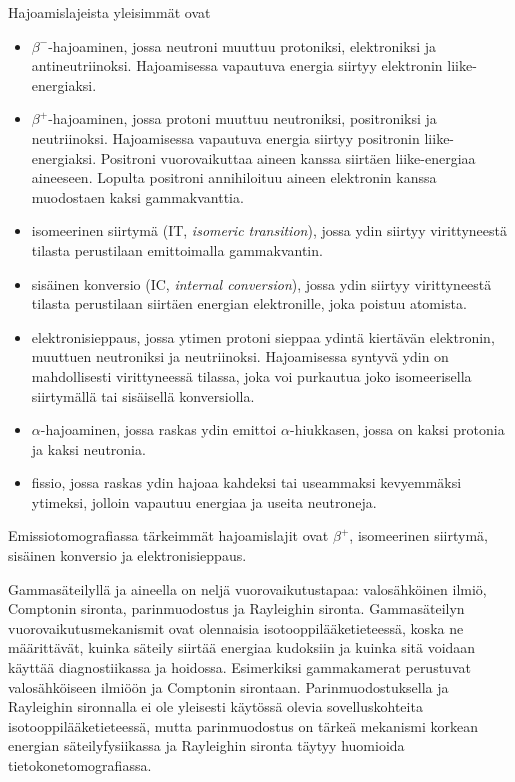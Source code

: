 Hajoamislajeista yleisimmät ovat\cite{cherry_modes_2012}
\begin{itemize}
    \item $\beta^{-}$-hajoaminen, jossa neutroni muuttuu protoniksi, elektroniksi ja antineutriinoksi.  Hajoamisessa vapautuva energia siirtyy elektronin liike-energiaksi.
    \item $\beta^{+}$-hajoaminen, jossa protoni muuttuu neutroniksi, positroniksi ja neutriinoksi. Hajoamisessa vapautuva energia siirtyy positronin liike-energiaksi. Positroni vuorovaikuttaa aineen kanssa siirtäen liike-energiaa aineeseen. Lopulta positroni annihiloituu aineen elektronin kanssa muodostaen kaksi gammakvanttia.
    \item isomeerinen siirtymä (IT, \textit{isomeric transition}), jossa ydin siirtyy virittyneestä tilasta perustilaan emittoimalla gammakvantin.
    \item sisäinen konversio (IC, \textit{internal conversion}), jossa ydin siirtyy virittyneestä tilasta perustilaan siirtäen energian elektronille, joka poistuu atomista.
    \item elektronisieppaus, jossa ytimen protoni sieppaa ydintä kiertävän elektronin, muuttuen neutroniksi ja neutriinoksi. Hajoamisessa syntyvä ydin on mahdollisesti virittyneessä tilassa, joka voi purkautua joko isomeerisella siirtymällä tai sisäisellä konversiolla.
    \item $\alpha$-hajoaminen, jossa raskas ydin emittoi $\alpha$-hiukkasen, jossa on kaksi protonia ja kaksi neutronia.
    \item fissio, jossa raskas ydin hajoaa kahdeksi tai useammaksi kevyemmäksi ytimeksi, jolloin vapautuu energiaa ja useita neutroneja.
\end{itemize}
Emissiotomografiassa tärkeimmät hajoamislajit ovat $\beta^{+}$, isomeerinen siirtymä, sisäinen konversio ja elektronisieppaus\cite{cherry_modes_2012}.

Gammasäteilyllä ja aineella on neljä vuorovaikutustapaa: valosähköinen ilmiö, Comptonin sironta, parinmuodostus ja Rayleighin sironta. Gammasäteilyn vuorovaikutusmekanismit ovat olennaisia isotooppilääketieteessä, koska ne määrittävät, kuinka säteily siirtää energiaa kudoksiin ja kuinka sitä voidaan käyttää diagnostiikassa ja hoidossa\cite{cherry_interaction_2012}. Esimerkiksi gammakamerat perustuvat valosähköiseen ilmiöön ja Comptonin sirontaan. Parinmuodostuksella ja Rayleighin sironnalla ei ole yleisesti käytössä olevia sovelluskohteita isotooppilääketieteessä, mutta parinmuodostus on tärkeä mekanismi korkean energian säteilyfysiikassa ja Rayleighin sironta täytyy huomioida tietokonetomografiassa.\cite{cherry_interaction_2012}

